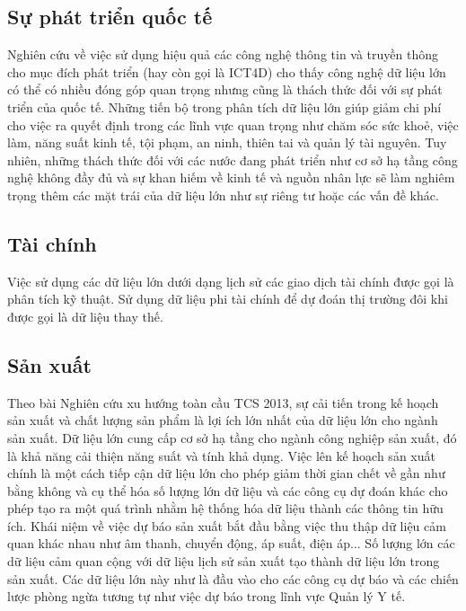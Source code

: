 \documentclass[12pt,a4paper]{report}
\begin{document}
\subsection{Sự phát triển quốc tế}
Nghiên cứu về việc sử dụng hiệu quả các công nghệ thông tin và truyền thông cho mục đích phát triển (hay còn gọi là ICT4D) cho thấy công nghệ dữ liệu lớn có thể có nhiều đóng góp quan trọng nhưng cũng là thách thức đối với sự phát triển của quốc tế. Những tiến bộ trong phân tích dữ liệu lớn giúp giảm chi phí cho việc ra quyết định trong các lĩnh vực quan trọng như chăm sóc sức khoẻ, việc làm, năng suất kinh tế, tội phạm, an ninh, thiên tai và quản lý tài nguyên. Tuy nhiên, những thách thức đối với các nước đang phát triển như cơ sở hạ tầng công nghệ không đầy đủ và sự khan hiếm về kinh tế và nguồn nhân lực sẽ làm nghiêm trọng thêm các mặt trái của dữ liệu lớn như sự riêng tư hoặc các vấn đề khác.
\subsection{Tài chính}
Việc sử dụng các dữ liệu lớn dưới dạng lịch sử các giao dịch tài chính được gọi là phân tích kỹ thuật. Sử dụng dữ liệu phi tài chính để dự đoán thị trường đôi khi được gọi là dữ liệu thay thế.
\subsection{Sản xuất}
Theo bài Nghiên cứu xu hướng toàn cầu TCS 2013, sự cải tiến trong kế hoạch sản xuất và chất lượng sản phẩm là lợi ích lớn nhất của dữ liệu lớn cho ngành sản xuất. Dữ liệu lớn cung cấp cơ sở hạ tầng cho ngành công nghiệp sản xuất, đó là khả năng cải thiện năng suất và tính khả dụng. Việc lên kế hoạch sản xuất chính là một cách tiếp cận dữ liệu lớn cho phép giảm thời gian chết về gần như bằng không và cụ thể hóa số lượng lớn dữ liệu và các công cụ dự đoán khác cho phép tạo ra một quá trình nhằm hệ thống hóa dữ liệu thành các thông tin hữu ích. Khái niệm về việc dự báo sản xuất bắt đầu bằng việc thu thập dữ liệu cảm quan khác nhau như âm thanh, chuyển động, áp suất, điện áp... Số lượng lớn các dữ liệu cảm quan cộng với dữ liệu lịch sử sản xuất tạo thành dữ liệu lớn trong sản xuất. Các dữ liệu lớn này như là đầu vào cho các công cụ dự báo và các chiến lược phòng ngừa tương tự như việc dự báo trong lĩnh vực Quản lý Y tế.
\end{document}

